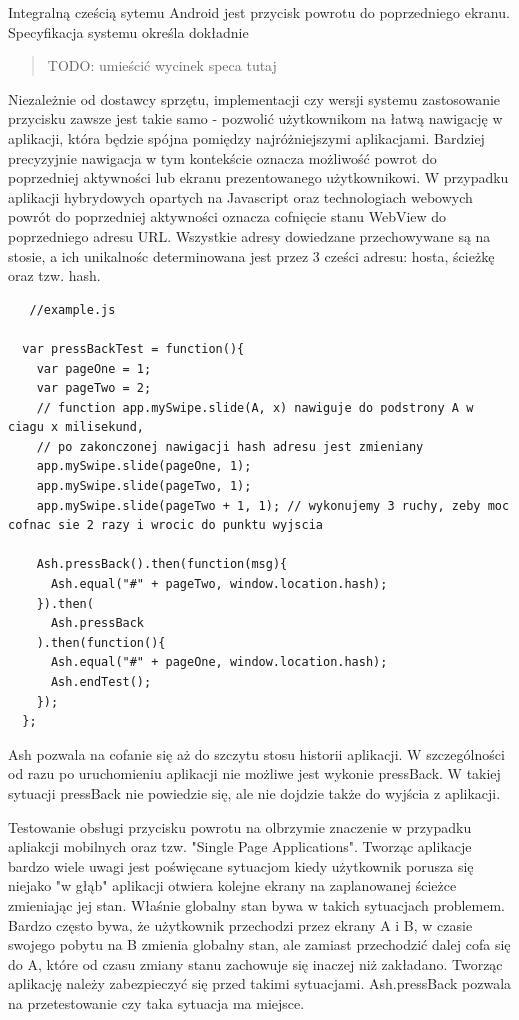 \documentclass[brudnopis]{xmgr}
\begin{document}
Integralną cześcią sytemu Android jest przycisk powrotu do poprzedniego ekranu. Specyfikacja systemu określa dokładnie

\begin{quote}
{TODO: umieścić wycinek speca tutaj}
\end{quote}

Niezależnie od dostawcy sprzętu, implementacji czy wersji systemu zastosowanie przycisku zawsze jest takie samo - pozwolić użytkownikom na łatwą nawigację w aplikacji, która będzie spójna pomiędzy najróżniejszymi aplikacjami. Bardziej precyzyjnie nawigacja w tym kontekście  oznacza możliwość powrot do poprzedniej aktywności lub ekranu prezentowanego użytkownikowi. W przypadku aplikacji hybrydowych opartych na Javascript oraz technologiach webowych powrót do poprzedniej aktywności oznacza cofnięcie stanu WebView do poprzedniego adresu URL. Wszystkie adresy dowiedzane przechowywane są na stosie, a ich unikalnośc determinowana jest przez 3 cześci adresu: hosta, ścieżkę oraz tzw. hash. 

\begin{lstlisting}
   //example.js

  var pressBackTest = function(){
    var pageOne = 1;
    var pageTwo = 2;
    // function app.mySwipe.slide(A, x) nawiguje do podstrony A w ciagu x milisekund,
    // po zakonczonej nawigacji hash adresu jest zmieniany
    app.mySwipe.slide(pageOne, 1); 
    app.mySwipe.slide(pageTwo, 1); 
    app.mySwipe.slide(pageTwo + 1, 1); // wykonujemy 3 ruchy, zeby moc cofnac sie 2 razy i wrocic do punktu wyjscia
    
    Ash.pressBack().then(function(msg){
      Ash.equal("#" + pageTwo, window.location.hash);
    }).then(
      Ash.pressBack
    ).then(function(){
      Ash.equal("#" + pageOne, window.location.hash);
      Ash.endTest();
    });
  };
\end{lstlisting}

Ash pozwala na cofanie się aż do szczytu stosu historii aplikacji. W szczególności od razu po uruchomieniu aplikacji nie możliwe jest wykonie pressBack. W takiej sytuacji pressBack nie powiedzie się, ale nie dojdzie także do wyjścia z aplikacji.

Testowanie obsługi przycisku powrotu na olbrzymie znaczenie w przypadku apliakcji mobilnych  oraz tzw. "Single Page Applications". Tworząc aplikacje bardzo wiele uwagi jest poświęcane sytuacjom kiedy użytkownik porusza się niejako "w głąb" aplikacji otwiera kolejne ekrany na zaplanowanej ścieżce zmieniając jej stan.  Właśnie globalny stan bywa w takich sytuacjach problemem. Bardzo często bywa, że użytkownik przechodzi przez ekrany A i B, w czasie swojego pobytu na B zmienia globalny stan, ale zamiast przechodzić dalej cofa się do A, które od czasu zmiany stanu zachowuje się inaczej niż zakładano. Tworząc aplikację należy zabezpieczyć się przed takimi sytuacjami. Ash.pressBack pozwala na przetestowanie czy taka sytuacja ma miejsce. 
\end{document}

